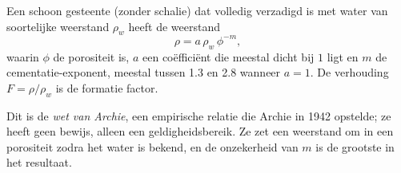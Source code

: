\begin{proposition}\label{prop:b3:field-lab-methods-3:archie}
Een schoon gesteente (zonder schalie) dat volledig verzadigd is met water van
soortelijke weerstand $\rho_w$ heeft de weerstand
\[
\rho = a\,\rho_w\,\phi^{-m} ,
\]
waarin $\phi$ de porositeit is, $a$ een coëfficiënt die meestal dicht bij $1$ ligt
en $m$ de cementatie-exponent, meestal tussen \num{1.3} en
\num{2.8} wanneer $a = 1$. De verhouding $F = \rho/\rho_w$ is de formatie
factor.
\end{proposition}
Dit is de \emph{wet van Archie}, een empirische relatie
die Archie in 1942 opstelde; ze heeft geen bewijs, alleen een geldigheidsbereik. Ze zet een weerstand om in een porositeit zodra het water is
bekend, en de onzekerheid van $m$ is de grootste in het resultaat.

